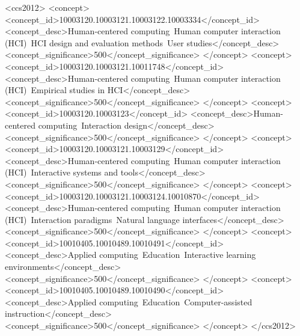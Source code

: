 \documentclass[acmlarge]{acmart}
\begin{document}
\begin{CCSXML}
<ccs2012>
  <concept>
    <concept_id>10003120.10003121.10003122.10003334</concept_id>
    <concept_desc>Human-centered computing~Human computer interaction (HCI)~HCI design and evaluation methods~User studies</concept_desc>
    <concept_significance>500</concept_significance>
  </concept>
  <concept>
    <concept_id>10003120.10003121.10011748</concept_id>
    <concept_desc>Human-centered computing~Human computer interaction (HCI)~Empirical studies in HCI</concept_desc>
    <concept_significance>500</concept_significance>
  </concept>
  <concept>
    <concept_id>10003120.10003123</concept_id>
    <concept_desc>Human-centered computing~Interaction design</concept_desc>
    <concept_significance>500</concept_significance>
  </concept>
  <concept>
    <concept_id>10003120.10003121.10003129</concept_id>
    <concept_desc>Human-centered computing~Human computer interaction (HCI)~Interactive systems and tools</concept_desc>
    <concept_significance>500</concept_significance>
  </concept>
  <concept>
    <concept_id>10003120.10003121.10003124.10010870</concept_id>
    <concept_desc>Human-centered computing~Human computer interaction (HCI)~Interaction paradigms~Natural language interfaces</concept_desc>
    <concept_significance>500</concept_significance>
  </concept>
  <concept>
    <concept_id>10010405.10010489.10010491</concept_id>
    <concept_desc>Applied computing~Education~Interactive learning environments</concept_desc>
    <concept_significance>500</concept_significance>
  </concept>
  <concept>
    <concept_id>10010405.10010489.10010490</concept_id>
    <concept_desc>Applied computing~Education~Computer-assisted instruction</concept_desc>
    <concept_significance>500</concept_significance>
  </concept>
</ccs2012>

\end{CCSXML}


\end{document}
